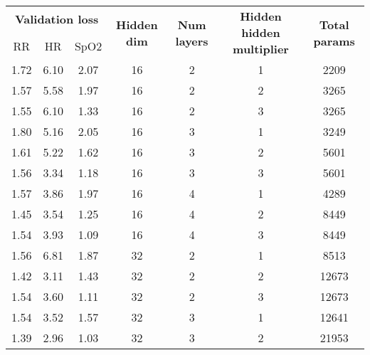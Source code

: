 \begin{table}[t]
    \begin{center}
        \begin{tabular}{ccccccc}
        \toprule
        \multicolumn{3}{c}{\textbf{Validation loss}} & \multirow{2}{*}{\textbf{Hidden dim}} & \multirow{2}{*}{\textbf{Num layers}} & \multirow{2}{*}{\textbf{Hidden hidden multiplier}} & \multirow{2}{*}{\textbf{Total params}} \\
        \cmidrule(lr){1-3}
        RR & HR & SpO2 & & & & \\
        \midrule
        1.72 &      6.10 &      2.07 &         16 &                        2 &          1 &        2209 \\
        1.57 &      5.58 &      1.97 &         16 &                        2 &          2 &        3265 \\
        1.55 &      6.10 &      1.33 &         16 &                        2 &          3 &        3265 \\
        1.80 &      5.16 &      2.05 &         16 &                        3 &          1 &        3249 \\
        1.61 &      5.22 &      1.62 &         16 &                        3 &          2 &        5601 \\
        1.56 &      3.34 &      1.18 &         16 &                        3 &          3 &        5601 \\
        1.57 &      3.86 &      1.97 &         16 &                        4 &          1 &        4289 \\
        1.45 &      3.54 &      1.25 &         16 &                        4 &          2 &        8449 \\
        1.54 &      3.93 &      1.09 &         16 &                        4 &          3 &        8449 \\
        1.56 &      6.81 &      1.87 &         32 &                        2 &          1 &        8513 \\
        1.42 &      3.11 &      1.43 &         32 &                        2 &          2 &       12673 \\
        1.54 &      3.60 &      1.11 &         32 &                        2 &          3 &       12673 \\
        1.54 &      3.52 &      1.57 &         32 &                        3 &          1 &       12641 \\
        1.39 &      2.96 &      1.03 &         32 &                        3 &          2 &       21953 \\

\end{tabular}
\end{center}
\end{table}
